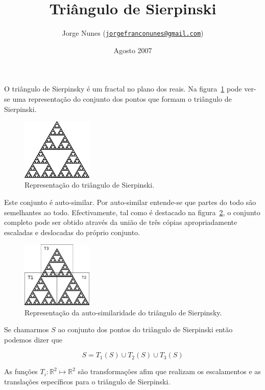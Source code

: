 \documentclass[11pt]{article}
\title{Triângulo de Sierpinski}
\author{Jorge Nunes ({\tt\href{mailto:jorgefranconunes@gmail.com}{jorgefranconunes@gmail.com}})}
\date{Agosto 2007}
\begin{document}
\maketitle

O triângulo de Sierpinsky é um fractal no plano dos reais. Na
figura~\ref{fig-triangulo} pode ver-se uma representação do conjunto
dos pontos que formam o triângulo de Sierpinski.

\begin{figure}[H]
  \centering
  \includegraphics[width=0.3\textwidth]{../images/xxx-007.png}
  \caption{Representação do triângulo de Sierpinski.}
  \label{fig-triangulo}
\end{figure}

Este conjunto é auto-similar. Por auto-similar entende-se que partes
do todo são semelhantes ao todo. Efectivamente, tal como é destacado
na figura~\ref{fig-sierpinski}, o conjunto completo pode ser obtido
através da união de três cópias apropriadamente escaladas e deslocadas
do próprio conjunto.

\begin{figure}[H]
  \centering
  \includegraphics[width=0.3\textwidth]{../images/sierpinski.png}
  \caption{Representação da auto-similaridade do triângulo de Sierpinsky.}
  \label{fig-sierpinski}
\end{figure}
 
Se chamarmos $S$ ao
conjunto dos pontos do triângulo de Sierpinski então podemos dizer que

\[
S = T_1(S) \cup T_2(S) \cup T_3(S)
\]

As funções $T_i : {\mathbb R}^2 \mapsto {\mathbb R}^2$ são
transformações afim que realizam os escalamentos e as translações
específicos para o triângulo de Sierpinski.
\end{document}

